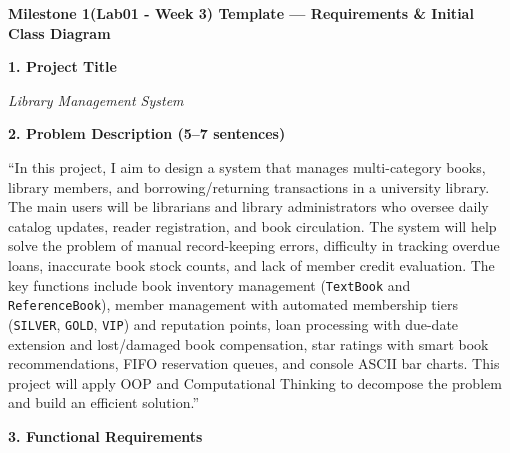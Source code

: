 \documentclass[12pt,a4paper]{article}
\begin{document}
\vspace{0.6cm}

{\fontsize{16}{20}\selectfont\bfseries Milestone 1(Lab01 - Week 3) Template --- Requirements \& Initial Class Diagram\par}

\hspace{0.8cm}{\itshape\bfseries Document Title: Milestone 1 -- Requirements Analysis, Decomposition \& Abstraction\par}

\textbf{1. Project Title}

\textit{Library Management System}

\textbf{2. Problem Description (5--7 sentences)}

``In this project, I aim to design a system that manages multi-category books, library members, and borrowing/returning transactions in a university library. The main users will be librarians and library administrators who oversee daily catalog updates, reader registration, and book circulation. The system will help solve the problem of manual record-keeping errors, difficulty in tracking overdue loans, inaccurate book stock counts, and lack of member credit evaluation. The key functions include book inventory management (\texttt{TextBook} and \texttt{ReferenceBook}), member management with automated membership tiers (\texttt{SILVER}, \texttt{GOLD}, \texttt{VIP}) and reputation points, loan processing with due-date extension and lost/damaged book compensation, star ratings with smart book recommendations, FIFO reservation queues, and console ASCII bar charts. This project will apply OOP and Computational Thinking to decompose the problem and build an efficient solution.''

\textbf{3. Functional Requirements}
\end{document}
